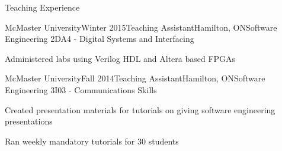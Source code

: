 \documentclass[usenames, dvipsnames]{resume} %
\begin{document}
\begin{rSection}{Teaching Experience}

\begin{rTeachSubsection}{McMaster University}{Winter 2015}{Teaching Assistant}{Hamilton, ON}{Software Engineering 2DA4 - Digital Systems and Interfacing}
	\item Administered labs using Verilog HDL and Altera based FPGAs
\end{rTeachSubsection}


\begin{rTeachSubsection}{McMaster University}{Fall 2014}{Teaching Assistant}{Hamilton, ON}{Software Engineering 3I03 - Communications Skills}
	\item Created presentation materials for tutorials on giving software engineering presentations
	\item Ran weekly mandatory tutorials for 30 students
\end{rTeachSubsection}
	
\end{rSection}

\end{document}
